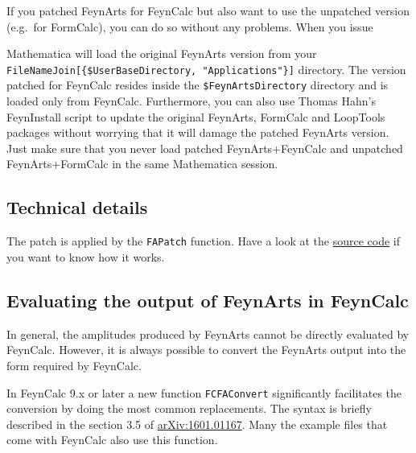 \documentclass[../FeynCalcManual.tex]{subfiles}
\begin{document}
If you patched FeynArts for FeynCalc but also want to use the unpatched
version (e.g.~for FormCalc), you can do so without any problems. When
you issue

\begin{Shaded}
\begin{Highlighting}[]
\end{Highlighting}
\end{Shaded}

Mathematica will load the original FeynArts version from your
\texttt{FileNameJoin[\allowbreak{}\{\allowbreak{}\$UserBaseDirectory,\ \allowbreak{}"Applications"\}]}
directory. The version patched for FeynCalc resides inside the
\texttt{\$FeynArtsDirectory} directory and is loaded only from FeynCalc.
Furthermore, you can also use Thomas Hahn's FeynInstall script to update
the original FeynArts, FormCalc and LoopTools packages without worrying
that it will damage the patched FeynArts version. Just make sure that
you never load patched FeynArts+FeynCalc and unpatched FeynArts+FormCalc
in the same Mathematica session.

\hypertarget{technical-details}{%
\subsection{Technical details}\label{technical-details}}

The patch is applied by the \texttt{FAPatch} function. Have a look at
the
\href{https://github.com/FeynCalc/feyncalc/blob/master/FeynCalc/Feynman/FAPatch.m}{source
code} if you want to know how it works.

\hypertarget{evaluating-the-output-of-feynarts-in-feyncalc}{%
\subsection{Evaluating the output of FeynArts in
FeynCalc}\label{evaluating-the-output-of-feynarts-in-feyncalc}}

In general, the amplitudes produced by FeynArts cannot be directly
evaluated by FeynCalc. However, it is always possible to convert the
FeynArts output into the form required by FeynCalc.

In FeynCalc 9.x or later a new function \texttt{FCFAConvert}
significantly facilitates the conversion by doing the most common
replacements. The syntax is briefly described in the section 3.5 of
\href{https://arxiv.org/pdf/1601.01167.pdf}{arXiv:1601.01167}. Many the
example files that come with FeynCalc also use this function.
\end{document}
